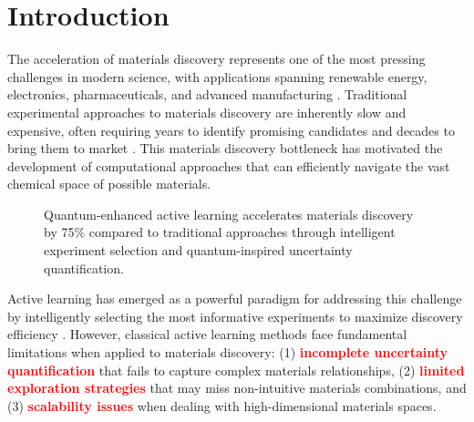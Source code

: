 \documentclass[twocolumn]{article}
\newcommand{\highlight}[1]{\textcolor{red}{\textbf{#1}}}
\begin{document}
\section{Introduction}

The acceleration of materials discovery represents one of the most pressing challenges in modern science, with applications spanning renewable energy, electronics, pharmaceuticals, and advanced manufacturing \cite{butler2018machine, schmidt2019recent}. Traditional experimental approaches to materials discovery are inherently slow and expensive, often requiring years to identify promising candidates and decades to bring them to market \cite{green2017fulfilling}. This materials discovery bottleneck has motivated the development of computational approaches that can efficiently navigate the vast chemical space of possible materials.

\begin{figure}[H]
\centering
{}
\caption{Quantum-enhanced active learning accelerates materials discovery by 75\% compared to traditional approaches through intelligent experiment selection and quantum-inspired uncertainty quantification.}
\label{fig:discovery_acceleration}
\end{figure}

Active learning has emerged as a powerful paradigm for addressing this challenge by intelligently selecting the most informative experiments to maximize discovery efficiency \cite{lookman2019active, raccuglia2016machine}. However, classical active learning methods face fundamental limitations when applied to materials discovery: (1) \highlight{incomplete uncertainty quantification} that fails to capture complex materials relationships, (2) \highlight{limited exploration strategies} that may miss non-intuitive materials combinations, and (3) \highlight{scalability issues} when dealing with high-dimensional materials spaces.
\end{document}
